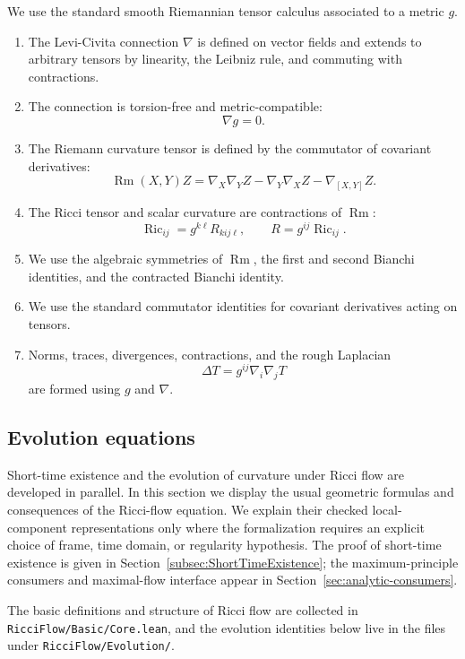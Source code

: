 \documentclass[11pt]{article}
\theoremstyle{plain}
\theoremstyle{definition}
\theoremstyle{remark}
\newcommand{\Ric}{\operatorname{Ric}}
\newcommand{\Rm}{\operatorname{Rm}}
\newcommand{\leanfile}[1]{\nolinkurl{#1}}
\newcommand{\rffile}[1]{\leanfile{#1}}
\newcommand{\rfdir}[1]{\leanfile{#1/}}
\begin{document}
We use the standard smooth Riemannian tensor calculus associated to a metric
$g$.
\begin{enumerate}[label=(\arabic*)]
  \item The Levi-Civita connection $\nabla$ is defined on vector fields and
  extends to arbitrary tensors by linearity, the Leibniz rule, and commuting
  with contractions.

  \item The connection is torsion-free and metric-compatible:
  \[
  \nabla g=0.
  \]

  \item The Riemann curvature tensor is defined by the commutator of covariant
  derivatives:
  \[
  \Rm(X,Y)Z
  =
  \nabla_X\nabla_YZ
  -\nabla_Y\nabla_XZ
  -\nabla_{[X,Y]}Z.
  \]

  \item The Ricci tensor and scalar curvature are contractions of $\Rm$:
  \[
  \Ric_{ij}=g^{k\ell}R_{kij\ell},
  \qquad
  R=g^{ij}\Ric_{ij}.
  \]

  \item We use the algebraic symmetries of $\Rm$, the first and second Bianchi
  identities, and the contracted Bianchi identity.

  \item We use the standard commutator identities for covariant derivatives
  acting on tensors.

  \item Norms, traces, divergences, contractions, and the rough Laplacian
  \[
  \Delta T=g^{ij}\nabla_i\nabla_jT
  \]
  are formed using $g$ and $\nabla$.
\end{enumerate}

\subsection{Evolution equations}

Short-time existence and the evolution of curvature under Ricci flow are
developed in parallel.  In this section we display the usual geometric
formulas and consequences of the Ricci-flow equation.  We explain their
checked local-component representations only where the formalization requires an
explicit choice of frame, time domain, or regularity hypothesis.  The proof of
short-time existence is given in
Section~\ref{subsec:ShortTimeExistence}; the maximum-principle consumers and
maximal-flow interface appear in Section~\ref{sec:analytic-consumers}.

The basic definitions and structure of Ricci flow are collected in
\rffile{RicciFlow/Basic/Core.lean}, and the evolution identities below live in
the files under \rfdir{RicciFlow/Evolution}.
\end{document}
